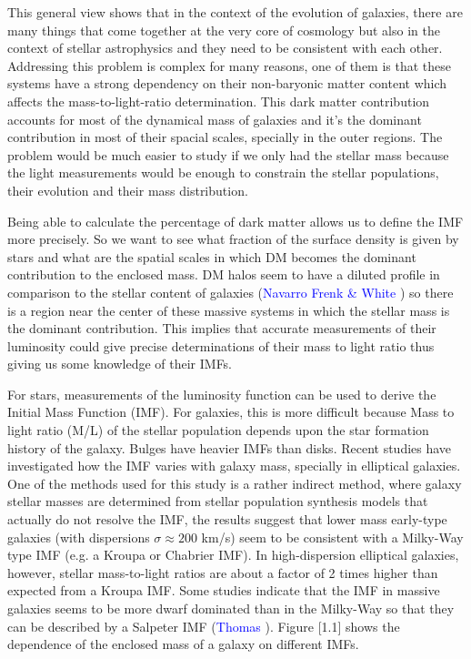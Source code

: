 This general view shows that in the context of the evolution of galaxies, there are many things that come together at the very core of cosmology but also in the context of stellar astrophysics and they need to be consistent with each other. Addressing this problem is complex for many reasons, one of them is that these systems have a strong dependency on their non-baryonic matter content which affects the mass-to-light-ratio determination. This dark matter contribution accounts for most of the dynamical mass of galaxies and it's the dominant contribution in most of their spacial scales, specially in the outer regions. The problem would be much easier to study if we only had the stellar mass because the light measurements would be enough to constrain the stellar populations, their evolution and their mass distribution. 

Being able to calculate the percentage of dark matter allows us to define the IMF more precisely. So we want to see what fraction of the surface density is given by stars and what are the spatial scales in which DM becomes the dominant contribution to the enclosed mass. DM halos seem to have a diluted profile in comparison to the stellar content of galaxies (\textcolor{blue}{Navarro Frenk \& White} \citeyear{Reference17}) so there is a region near the center of these massive systems in which the stellar mass is the dominant contribution. This implies that accurate measurements of their luminosity could give precise determinations of their mass to light ratio thus giving us some knowledge of their IMFs.

For stars, measurements of the luminosity function can be used to derive the Initial Mass Function (IMF). For galaxies, this is more difficult because Mass to light ratio (M/L) of the stellar population depends upon the star formation history of the galaxy. Bulges have heavier IMFs than disks. Recent studies have investigated how the IMF varies with galaxy mass, specially in elliptical galaxies. One of the methods used for this study is a rather indirect method, where galaxy stellar masses are determined from stellar population synthesis models that actually do not resolve the IMF, the results suggest that lower mass early-type galaxies (with dispersions $\sigma \approx 200$ km/s) seem to be consistent with a Milky-Way type IMF (e.g. a Kroupa or Chabrier IMF). In high-dispersion elliptical galaxies, however, stellar mass-to-light ratios are about a factor of 2 times higher than expected from a Kroupa IMF. Some studies indicate that the IMF in massive galaxies seems to be more dwarf dominated than in the Milky-Way so that they can be described by a Salpeter IMF (\textcolor{blue}{Thomas} \citeyear{Reference28}). Figure [1.1] shows the dependence of the enclosed mass of a galaxy on different IMFs.

